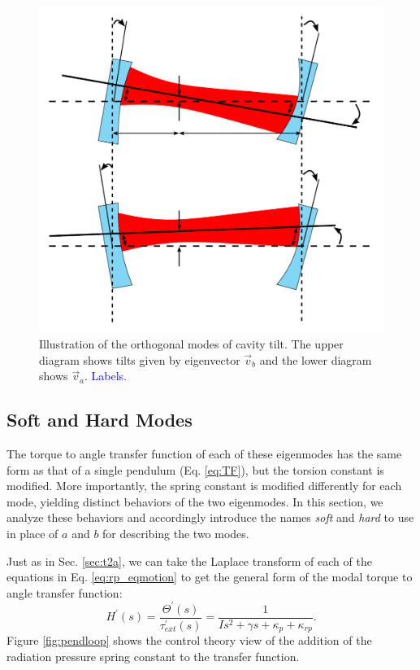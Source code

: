 \begin{figure}
\begin{centering}
\includegraphics[width=0.6\columnwidth]{figures/eigenmodes.pdf}
\caption[Illustration of the orthogonal modes of cavity
tilt]{Illustration of the orthogonal modes of cavity tilt. The upper
  diagram shows tilts given by eigenvector $\vec{v}_b$ and the lower
  diagram shows $\vec{v}_a$. \textcolor{blue}{Labels.}}
\label{fig:ss}
\end{centering}
\end{figure}




\subsection{Soft and Hard Modes} 
The torque to angle transfer function of each of these eigenmodes has
the same form as that of a single pendulum (Eq. \ref{eq:TF}), but the
torsion constant is modified. More importantly, the spring constant is
modified differently for each mode, yielding distinct behaviors of the
two eigenmodes. In this section, we analyze these behaviors and
accordingly introduce the names \emph{soft} and \emph{hard} to use in
place of $a$ and $b$ for describing the two modes.

Just as in Sec. \ref{sec:t2a}, we can take the Laplace transform of
each of the equations in Eq. \ref{eq:rp_eqmotion} to get the general
form of the modal torque to angle transfer function:
\begin{equation}
H^\prime(s) = \frac{\Theta^\prime(s)}{\tau_{ext}^\prime(s)} = \frac{1}{I s^2 + \gamma s +
  \kappa_p + \kappa_{rp}}.
\label{eq:modalTF}
\end{equation} 
Figure \ref{fig:pendloop} shows the control theory view of
the addition of the radiation pressure spring constant to the transfer
function.

